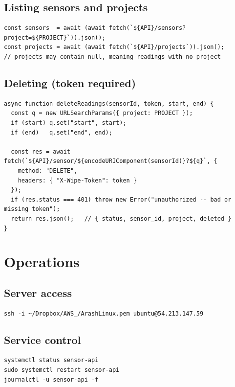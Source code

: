 \documentclass[11pt,a4paper]{article}
\begin{document}
\subsection{Listing sensors and projects}
\begin{lstlisting}[style=js]
const sensors  = await (await fetch(`${API}/sensors?project=${PROJECT}`)).json();
const projects = await (await fetch(`${API}/projects`)).json();
// projects may contain null, meaning readings with no project
\end{lstlisting}

\subsection{Deleting (token required)}
\begin{lstlisting}[style=js]
async function deleteReadings(sensorId, token, start, end) {
  const q = new URLSearchParams({ project: PROJECT });
  if (start) q.set("start", start);
  if (end)   q.set("end", end);

  const res = await fetch(`${API}/sensor/${encodeURIComponent(sensorId)}?${q}`, {
    method: "DELETE",
    headers: { "X-Wipe-Token": token }
  });
  if (res.status === 401) throw new Error("unauthorized -- bad or missing token");
  return res.json();   // { status, sensor_id, project, deleted }
}
\end{lstlisting}

\section{Operations}

\subsection{Server access}
\begin{lstlisting}
ssh -i ~/Dropbox/AWS_/ArashLinux.pem ubuntu@54.213.147.59
\end{lstlisting}

\subsection{Service control}
\begin{lstlisting}
systemctl status sensor-api
sudo systemctl restart sensor-api
journalctl -u sensor-api -f
\end{lstlisting}
\end{document}
